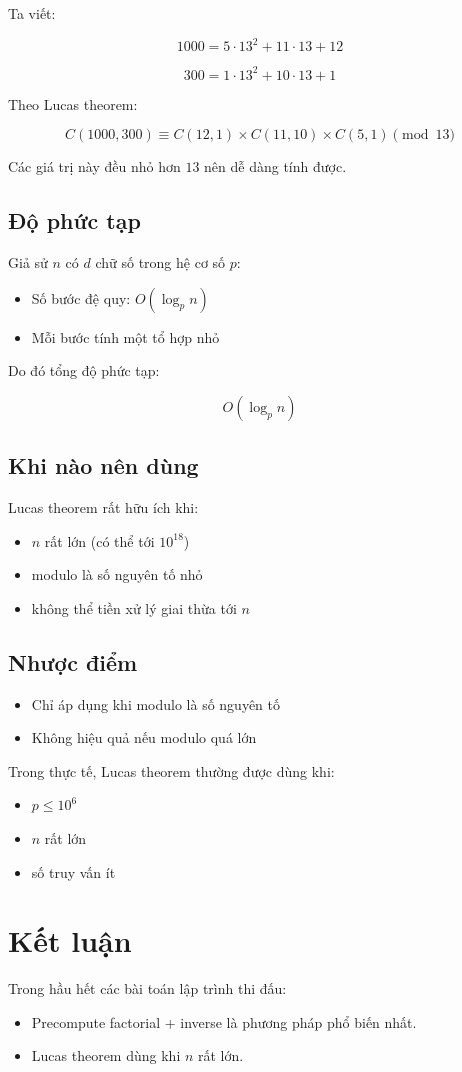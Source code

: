 Ta viết:

\[
1000 = 5 \cdot 13^2 + 11 \cdot 13 + 12
\]

\[
300 = 1 \cdot 13^2 + 10 \cdot 13 + 1
\]

Theo Lucas theorem:

\[
C(1000,300)
\equiv
C(12,1) \times C(11,10) \times C(5,1)
\pmod{13}
\]

Các giá trị này đều nhỏ hơn $13$ nên dễ dàng tính được.

\subsection*{Độ phức tạp}

Giả sử $n$ có $d$ chữ số trong hệ cơ số $p$:

\begin{itemize}
\item Số bước đệ quy: $O(\log_p n)$
\item Mỗi bước tính một tổ hợp nhỏ
\end{itemize}

Do đó tổng độ phức tạp:

\[
O(\log_p n)
\]

\subsection*{Khi nào nên dùng}

Lucas theorem rất hữu ích khi:

\begin{itemize}
\item $n$ rất lớn (có thể tới $10^{18}$)
\item modulo là số nguyên tố nhỏ
\item không thể tiền xử lý giai thừa tới $n$
\end{itemize}

\subsection*{Nhược điểm}

\begin{itemize}
\item Chỉ áp dụng khi modulo là số nguyên tố
\item Không hiệu quả nếu modulo quá lớn
\end{itemize}

Trong thực tế, Lucas theorem thường được dùng khi:

\begin{itemize}
\item $p \le 10^6$
\item $n$ rất lớn
\item số truy vấn ít
\end{itemize}

\newpage

\section{Kết luận}

Trong hầu hết các bài toán lập trình thi đấu:

\begin{itemize}
\item Precompute factorial + inverse là phương pháp phổ biến nhất.
\item Lucas theorem dùng khi $n$ rất lớn.
\end{itemize}
